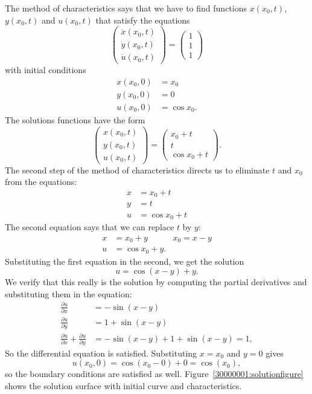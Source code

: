 \begin{loesung}
The method of characteristics says that we have to find functions
$x(x_0, t)$, $y(x_0,t)$ and $u(x_0,t)$ that satisfy the equations
\[
\begin{pmatrix}
\dot x(x_0,t)\\
\dot y(x_0,t)\\
\dot u(x_0,t)
\end{pmatrix}
=\begin{pmatrix}
1\\1\\1
\end{pmatrix}
\]
with initial conditions
\begin{align*}
x(x_0,0)&=x_0\\
y(x_0,0)&=0\\
u(x_0,0)&=\cos x_0.
\end{align*}
The solutions functions have the form
\[
\begin{pmatrix}
x(x_0,t)\\
y(x_0,t)\\
u(x_0,t)
\end{pmatrix}
=
\begin{pmatrix}
x_0+t\\
t\\
\cos x_0 + t
\end{pmatrix}.
\]
The second step of the method of characteristics directs us to
eliminate $t$ and $x_0$ from the equations:
\begin{align*}
x&=x_0+t\\
y&=t\\
u&=\cos x_0 + t
\end{align*}
The second equation says that we can replace $t$ by $y$:
\begin{align*}
x&=x_0+y&x_0=x-y\\
u&=\cos x_0 + y.
\end{align*}
Substituting the first equation in the second, we get the solution
\[
u=\cos(x-y)+y.
\]
We verify that this really is the solution by computing the
partial derivatives and substituting them in the equation:
\begin{align*}
\frac{\partial u}{\partial x}
&=
-\sin(x-y)
\\
\frac{\partial u}{\partial y}
&=
1+\sin(x-y)
\\
\frac{\partial u}{\partial x}
+
\frac{\partial u}{\partial y}
&=
-\sin(x-y)
+
1+\sin(x-y)
=1,
\end{align*}
So the differential equation is satisfied.
Substituting $x=x_0$ and $y=0$ gives
\[
u(x_0,0) = \cos(x_0-0)+0 = \cos(x_0),
\]
so the boundary conditions are satisfied as well.
Figure~\ref{30000001:solutionfigure} shows the solution surface
with initial curve and characteristics.
\end{loesung}

